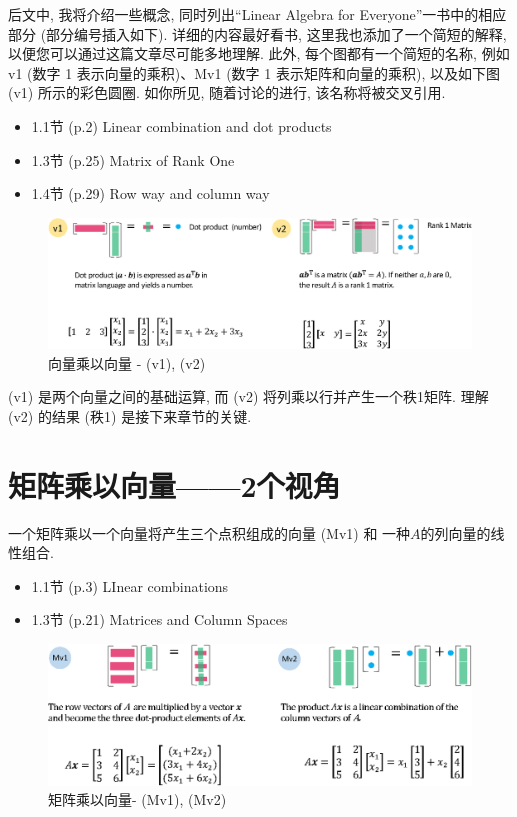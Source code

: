\documentclass[letterpaper]{article}
\begin{document}
后文中, 我将介绍一些概念, 同时列出“Linear Algebra for Everyone”一书中的相应部分 (部分编号插入如下). 
详细的内容最好看书, 这里我也添加了一个简短的解释, 以便您可以通过这篇文章尽可能多地理解. 
此外, 每个图都有一个简短的名称, 例如 v1 (数字 1 表示向量的乘积)、Mv1 (数字 1 表示矩阵和向量的乘积), 以及如下图 (v1) 所示的彩色圆圈. 
如你所见, 随着讨论的进行, 该名称将被交叉引用. 

\begin{itemize}
  \item 1.1节 (p.2) Linear combination and dot products
  \item 1.3节 (p.25) Matrix of Rank One
  \item 1.4节 (p.29) Row way and column way
\end{itemize}

\begin{figure}[H]
  \centering
  \includegraphics[scale=0.8]{VectorTimesVector.eps}
  \caption{向量乘以向量 - (v1), (v2)}
\end{figure}

(v1) 是两个向量之间的基础运算, 而 (v2) 将列乘以行并产生一个秩1矩阵. 
理解 (v2) 的结果 (秩1) 是接下来章节的关键.

\section{矩阵乘以向量——2个视角}

一个矩阵乘以一个向量将产生三个点积组成的向量 (Mv1) 和
一种$A$的列向量的线性组合.

\begin{itemize}
  \item 1.1节 (p.3) LInear combinations
  \item 1.3节 (p.21) Matrices and Column Spaces
\end{itemize} 

\begin{figure}[H]
  \centering
  \includegraphics[scale=0.8]{MatrixTimesVector.eps}
  \caption{矩阵乘以向量- (Mv1), (Mv2)}
\end{figure}
\end{document}
